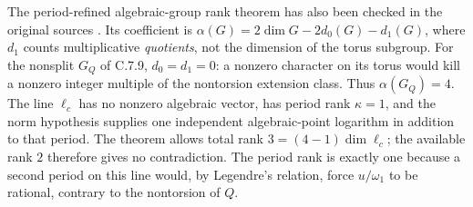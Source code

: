 The period-refined algebraic-group rank theorem has also been
checked in the original sources
\citep[Theorem 4.1 and Corollary 4.3]{waldschmidt1988periodrank}
\citep[main theorem, p.~363]{roy1993periodrank}.
Its coefficient is
$\alpha(G)=2\dim G-2d_0(G)-d_1(G)$, where $d_1$
counts multiplicative \emph{quotients}, not the dimension of
the torus subgroup.  For the nonsplit $G_Q$ of C.7.9,
$d_0=d_1=0$: a nonzero character on its torus would kill
a nonzero integer multiple of the nontorsion extension class.
Thus $\alpha(G_Q)=4$.  The line $\ell_c$ has no nonzero
algebraic vector, has period rank $\kappa=1$, and the norm
hypothesis supplies one independent algebraic-point logarithm
in addition to that period.  The theorem allows total rank
$3=(4-1)\dim\ell_c$; the available rank $2$ therefore gives
no contradiction.  The period rank is exactly one because
a second period on this line would, by Legendre's relation,
force $u/\omega_1$ to be rational, contrary to the
nontorsion of $Q$.
